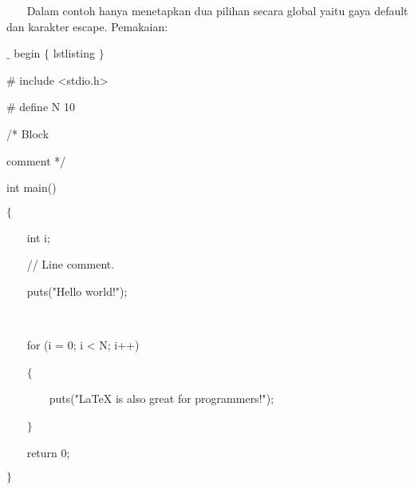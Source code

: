 \vspace{12pt}
\noindent ~~~ Dalam contoh hanya menetapkan dua pilihan secara global yaitu gaya default dan karakter escape. Pemakaian:\par

{\fontsize{10pt}{10pt}\selectfont  $ \_ $ begin $ \{ $ lstlisting $ \} $ }\par

{\fontsize{10pt}{10pt}\selectfont  $\#$ include <stdio.h>}\par

{\fontsize{10pt}{10pt}\selectfont  $\#$ define N 10}\par

{\fontsize{10pt}{10pt}\selectfont /* Block}\par

{\fontsize{10pt}{10pt}\selectfont  * comment */}\par

{\fontsize{10pt}{10pt}\selectfont int main()}\par

{\fontsize{10pt}{10pt}\selectfont  $ \{ $ }\par

{\fontsize{10pt}{10pt}\selectfont ~~~ int i;}\par

{\fontsize{10pt}{10pt}\selectfont ~~~ // Line comment.}\par

{\fontsize{10pt}{10pt}\selectfont ~~~ puts("Hello world!");}\par

{\fontsize{10pt}{10pt}\selectfont ~~~ }\par

{\fontsize{10pt}{10pt}\selectfont ~~~ for (i = 0; i < N; i++)}\par

{\fontsize{10pt}{10pt}\selectfont ~~~  $ \{ $ }\par

{\fontsize{10pt}{10pt}\selectfont ~~~~~~~ puts("LaTeX is also great for programmers!");}\par

{\fontsize{10pt}{10pt}\selectfont ~~~  $ \} $ }\par

{\fontsize{10pt}{10pt}\selectfont ~~~ return 0;}\par

{\fontsize{10pt}{10pt}\selectfont  $ \} $ }\par

